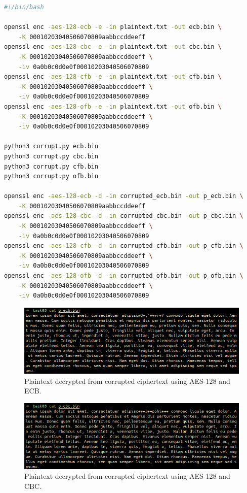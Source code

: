 \documentclass{article}
\begin{document}
\begin{lstlisting}[language=bash]
#!/bin/bash

openssl enc -aes-128-ecb -e -in plaintext.txt -out ecb.bin \
    -K 00010203040506070809aabbccddeeff
openssl enc -aes-128-cbc -e -in plaintext.txt -out cbc.bin \
    -K 00010203040506070809aabbccddeeff \
    -iv 0a0b0c0d0e0f00010203040506070809
openssl enc -aes-128-cfb -e -in plaintext.txt -out cfb.bin \
    -K 00010203040506070809aabbccddeeff \
    -iv 0a0b0c0d0e0f00010203040506070809
openssl enc -aes-128-ofb -e -in plaintext.txt -out ofb.bin \
    -K 00010203040506070809aabbccddeeff \
    -iv 0a0b0c0d0e0f00010203040506070809

python3 corrupt.py ecb.bin
python3 corrupt.py cbc.bin
python3 corrupt.py cfb.bin
python3 corrupt.py ofb.bin

openssl enc -aes-128-ecb -d -in corrupted_ecb.bin -out p_ecb.bin \
    -K 00010203040506070809aabbccddeeff
openssl enc -aes-128-cbc -d -in corrupted_cbc.bin -out p_cbc.bin \
    -K 00010203040506070809aabbccddeeff \
    -iv 0a0b0c0d0e0f00010203040506070809
openssl enc -aes-128-cfb -d -in corrupted_cfb.bin -out p_cfb.bin \
    -K 00010203040506070809aabbccddeeff \
    -iv 0a0b0c0d0e0f00010203040506070809
openssl enc -aes-128-ofb -d -in corrupted_ofb.bin -out p_ofb.bin \
    -K 00010203040506070809aabbccddeeff \
    -iv 0a0b0c0d0e0f00010203040506070809
\end{lstlisting}

\begin{figure}[!ht]
    \centering
    \includegraphics[scale=0.68]{task05_ecb.png}
    \caption{Plaintext decrypted from corrupted ciphertext using AES-128 and ECB.}
\end{figure}

\begin{figure}[!ht]
    \centering
    \includegraphics[scale=0.68]{task05_cbc.png}
    \caption{Plaintext decrypted from corrupted ciphertext using AES-128 and CBC.}
\end{figure}
\end{document}
